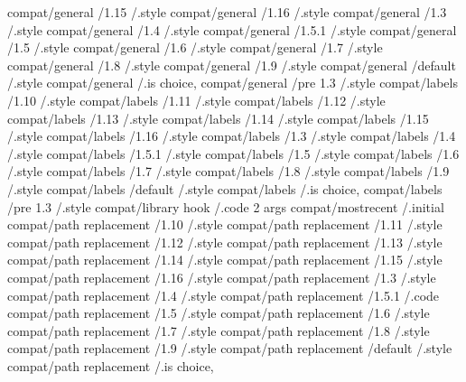compat/general                 /1.15        /.style
compat/general                 /1.16        /.style
compat/general                 /1.3         /.style
compat/general                 /1.4         /.style
compat/general                 /1.5.1       /.style
compat/general                 /1.5         /.style
compat/general                 /1.6         /.style
compat/general                 /1.7         /.style
compat/general                 /1.8         /.style
compat/general                 /1.9         /.style
compat/general                 /default     /.style
compat/general                              /.is choice, 
compat/general                 /pre 1.3     /.style
compat/labels                  /1.10        /.style
compat/labels                  /1.11        /.style
compat/labels                  /1.12        /.style
compat/labels                  /1.13        /.style
compat/labels                  /1.14        /.style
compat/labels                  /1.15        /.style
compat/labels                  /1.16        /.style
compat/labels                  /1.3         /.style
compat/labels                  /1.4         /.style
compat/labels                  /1.5.1       /.style
compat/labels                  /1.5         /.style
compat/labels                  /1.6         /.style
compat/labels                  /1.7         /.style
compat/labels                  /1.8         /.style
compat/labels                  /1.9         /.style
compat/labels                  /default     /.style
compat/labels                               /.is choice, 
compat/labels                  /pre 1.3     /.style
compat/library hook                         /.code 2 args
compat/mostrecent                           /.initial    
compat/path replacement        /1.10        /.style
compat/path replacement        /1.11        /.style
compat/path replacement        /1.12        /.style
compat/path replacement        /1.13        /.style
compat/path replacement        /1.14        /.style
compat/path replacement        /1.15        /.style
compat/path replacement        /1.16        /.style
compat/path replacement        /1.3         /.style
compat/path replacement        /1.4         /.style
compat/path replacement        /1.5.1       /.code
compat/path replacement        /1.5         /.style
compat/path replacement        /1.6         /.style
compat/path replacement        /1.7         /.style
compat/path replacement        /1.8         /.style
compat/path replacement        /1.9         /.style
compat/path replacement        /default     /.style
compat/path replacement                     /.is choice, 
